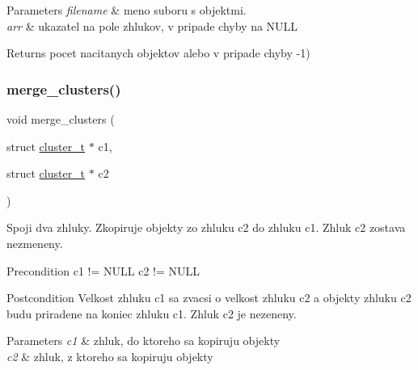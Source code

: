 \begin{DoxyParams}{Parameters}
{\em filename} & meno suboru s objektmi. \\
\hline
{\em arr} & ukazatel na pole zhlukov, v pripade chyby na N\+U\+LL \\
\hline
\end{DoxyParams}
\begin{DoxyReturn}{Returns}
pocet nacitanych objektov alebo v pripade chyby -\/1) 
\end{DoxyReturn}
\mbox{\label{group__clusts_gac39a25fdec1f4952ec92ee5407893158}} 
\subsubsection{\texorpdfstring{merge\+\_\+clusters()}{merge\_clusters()}}
{\footnotesize\ttfamily void merge\+\_\+clusters (\begin{DoxyParamCaption}\item[{struct \hyperlink{structcluster__t}{cluster\+\_\+t} $\ast$}]{c1,  }\item[{struct \hyperlink{structcluster__t}{cluster\+\_\+t} $\ast$}]{c2 }\end{DoxyParamCaption})}

Spoji dva zhluky. Zkopiruje objekty zo zhluku \textquotesingle{}c2\textquotesingle{} do zhluku \textquotesingle{}c1\textquotesingle{}. Zhluk \textquotesingle{}c2\textquotesingle{} zostava nezmeneny.

\begin{DoxyPrecond}{Precondition}
c1 != N\+U\+LL c2 != N\+U\+LL
\end{DoxyPrecond}
\begin{DoxyPostcond}{Postcondition}
Velkost zhluku \textquotesingle{}c1\textquotesingle{} sa zvacsi o velkost zhluku \textquotesingle{}c2\textquotesingle{} a objekty zhluku \textquotesingle{}c2\textquotesingle{} budu priradene na koniec zhluku \textquotesingle{}c1\textquotesingle{}. Zhluk \textquotesingle{}c2\textquotesingle{} je nezeneny.
\end{DoxyPostcond}

\begin{DoxyParams}{Parameters}
{\em c1} & zhluk, do ktoreho sa kopiruju objekty \\
\hline
{\em c2} & zhluk, z ktoreho sa kopiruju objekty \\
\hline
\end{DoxyParams}
\mbox{\label{group__clusts_ga703ce6afddf65026b68645bc5394405b}} 
